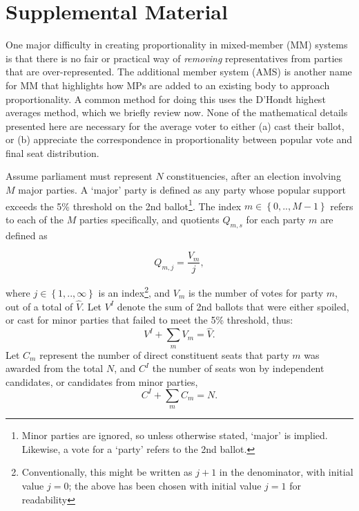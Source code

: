 \documentclass[DIV=calc, paper=a4, fontsize=11pt, twocolumn]{scrartcl}	 %
\begin{document}

\clearpage
\renewcommand{\theequation}{S.\arabic{equation}}
\renewcommand{\thesection}{S.\arabic{section}}
\setcounter{section}{0}
\setcounter{equation}{0}
\setcounter{page}{1}

\section*{Supplemental Material}

One major difficulty in creating proportionality in mixed-member (MM) systems is that there is no fair or practical way of \emph{removing} representatives from parties that are over-represented. 
The additional member system (AMS) is another name for MM that highlights how MPs are added to an existing body to approach proportionality. 
A common method for doing this uses the D'Hondt highest averages method, which we briefly review now. None of the mathematical details presented here are necessary for the average voter to either (a) cast their ballot, or (b) appreciate the correspondence in proportionality between popular vote and final seat distribution.

Assume parliament must represent $N$ constituencies, after an election involving $M$ major parties. A `major' party is defined as any party whose popular support exceeds the 5\% threshold on the 2nd ballot\footnote{Minor parties are ignored, so unless otherwise stated, `major' is implied. Likewise, a vote for a `party' refers to the 2nd ballot.}. 
The index  $m \in \left\{0, .., M-1\right\} $  refers to each of the $M$ parties specifically, and quotients $Q_{m,s}$ for each party $m$ are defined as 

\begin{equation}
\label{eq:DhondtSupp}
Q_{m,j} = \frac{V_m}{j},
\end{equation}

where $j \in \left\{ 1,.., \infty \right\}$ is an index\footnote{Conventionally, this might be written as $j+1$ in the denominator, with initial value $j=0$; the above has been chosen with initial value $j=1$ for readability}, and  $V_m$ is the number of votes for party $m$, out of a total of $\hat{V}$. Let $V^I$ denote the sum of 2nd ballots that were either spoiled, or cast for minor parties that failed to meet the 5\% threshold, thus: 
\begin{equation}
\label{eq:sum_Vm}
V^I + \sum_m V_m = \hat{V}.
\end{equation}
Let $C_m$ represent the number of direct constituent seats that party $m$ was awarded from the total $N$, and $C^I$ the number of seats won by independent candidates, or candidates from minor parties,
\begin{equation}
\label{eq:sum_Cm}
C^I + \sum_m C_m = N.
\end{equation}
\end{document}
